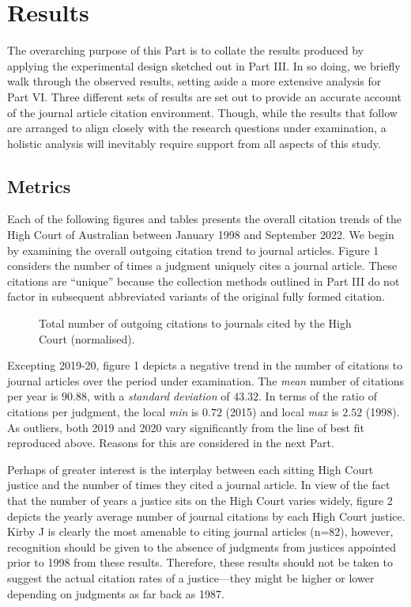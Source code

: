 \let\xn\xnote
\section{Results}

The overarching purpose of this Part is to collate the results produced by applying the experimental design sketched out in Part III. In so doing, we briefly walk through the observed results, setting aside a more extensive analysis for Part VI. Three different sets of results are set out to provide an accurate account of the journal article citation environment. Though, while the results that follow are arranged to align closely with the research questions under examination, a holistic analysis will inevitably require support from all aspects of this study.

\subsection{Metrics}

Each of the following figures and tables presents the overall citation trends of the High Court of Australian between January 1998 and September 2022. We begin by examining the overall outgoing citation trend to journal articles. Figure 1 considers the number of times a judgment uniquely cites a journal article. These citations are ``unique'' because the collection methods outlined in Part III do not factor in subsequent abbreviated variants of the original fully formed citation.

\begin{figure}[!htpb]
    \centering
    \makebox[\textwidth][c]{}
    \caption{Total number of outgoing citations to journals cited by the High Court (normalised).}
\end{figure}

Excepting 2019-20, figure 1 depicts a negative trend in the number of citations to journal articles over the period under examination. The \emph{mean} number of citations per year is $90.88$, with a \emph{standard deviation} of $43.32$. In terms of the ratio of citations per judgment, the local \emph{min} is $0.72$ (2015) and local \emph{max} is $2.52$ (1998). As outliers, both 2019 and 2020 vary significantly from the line of best fit reproduced above. Reasons for this are considered in the next Part.

Perhaps of greater interest is the interplay between each sitting High Court justice and the number of times they cited a journal article. In view of the fact that the number of years a justice sits on the High Court varies widely, figure 2 depicts the yearly average number of journal citations by each High Court justice. Kirby J is clearly the most amenable to citing journal articles (n=$82$), however, recognition should be given to the absence of judgments from justices appointed prior to 1998 from these results.\xn{5-1} Therefore, these results should not be taken to suggest the actual citation rates of a justice---they might be higher or lower depending on judgments as far back as 1987.

